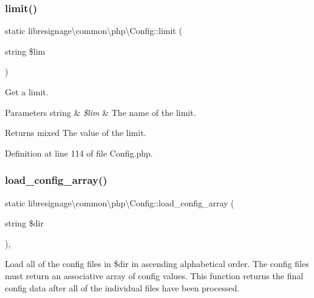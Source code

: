 \subsubsection{\texorpdfstring{limit()}{limit()}}
{\footnotesize\ttfamily static libresignage\textbackslash{}common\textbackslash{}php\textbackslash{}\+Config\+::limit (\begin{DoxyParamCaption}\item[{string}]{\$lim }\end{DoxyParamCaption})\hspace{0.3cm}{\ttfamily [static]}}

Get a limit.


\begin{DoxyParams}[1]{Parameters}
string & {\em \$lim} & The name of the limit.\\
\hline
\end{DoxyParams}
\begin{DoxyReturn}{Returns}
mixed The value of the limit. 
\end{DoxyReturn}


Definition at line 114 of file Config.\+php.

\mbox{\label{classlibresignage_1_1common_1_1php_1_1Config_aeb976d56d589cd3671c91bb84a67f50f}} 
\subsubsection{\texorpdfstring{load\+\_\+config\+\_\+array()}{load\_config\_array()}}
{\footnotesize\ttfamily static libresignage\textbackslash{}common\textbackslash{}php\textbackslash{}\+Config\+::load\+\_\+config\+\_\+array (\begin{DoxyParamCaption}\item[{string}]{\$dir }\end{DoxyParamCaption})\hspace{0.3cm}{\ttfamily [static]}, {\ttfamily [private]}}

Load all of the config files in \$dir in ascending alphabetical order. The config files must return an associative array of config values. This function returns the final config data after all of the individual files have been processed.


